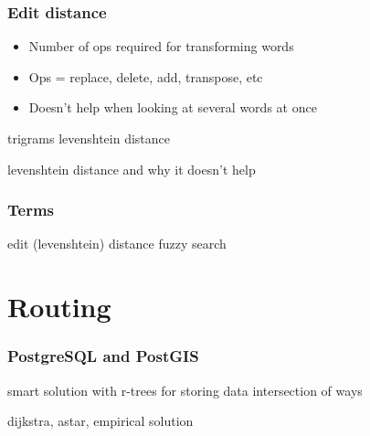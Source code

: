 \documentclass[14pt]{beamer}
\begin{document}

\begin{frame}
  \frametitle{Edit distance}
  \begin{itemize}
  \item Number of ops required for transforming words
  \item Ops = replace, delete, add, transpose, etc
  \item Doesn't help when looking at several words at once
  \end{itemize}
  trigrams
  levenshtein distance
\end{frame}

\begin{frame}
  levenshtein distance and why it doesn't help
\end{frame}

\begin{frame}
  \frametitle{Terms}
  edit (levenshtein) distance
  fuzzy search
\end{frame}










\section{Routing}

\begin{frame}
  \frametitle{PostgreSQL and PostGIS}

\end{frame}

\begin{frame}
  smart solution with r-trees for storing data
  intersection of ways
\end{frame}

\begin{frame}
  dijkstra, astar, empirical solution
\end{frame}










\end{document}
